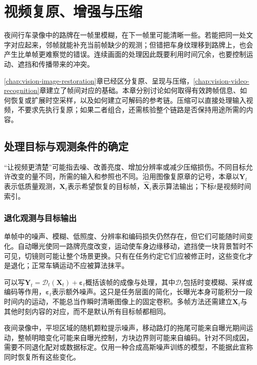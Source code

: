 \chapter{视频复原、增强与压缩}
\label{chap:vision-video-restoration}

夜间行车录像中的路牌在一帧里模糊，在下一帧里可能清晰一些。若能把同一处文字对应起来，邻帧就能补充当前帧缺少的观测；但错把车身纹理移到路牌上，也会产生比单帧更难察觉的错误。连续画面的处理因此既要利用时间冗余，也要控制运动、遮挡和传播带来的冲突。

\ref{chap:vision-image-restoration}章已经区分复原、呈现与压缩，\ref{chap:vision-video-recognition}章建立了帧间对应的基础。本章分别讨论如何取得有效跨帧信息、如何恢复或扩展时空采样，以及如何建立可解码的参考链。压缩可以直接处理输入视频，不要求先执行复原；如果二者组合，还需核验整个链路是否保持用途所需的内容。

\section{处理目标与观测条件的确定}
\label{sec:vision-video-restoration-goals}

“让视频更清楚”可能指去噪、改善亮度、增加分辨率或减少压缩损伤。不同目标允许改变的量不同，所需的输入和参照也不同。沿用图像复原章的记号，本章以$\bm{Y}_t$表示低质量观测，$\bm{X}_t$表示希望恢复的目标帧，$\widehat{\bm{X}}_t$表示算法输出；下标$t$是视频时间索引。

\subsection{退化观测与目标输出}
\label{sec:vision-video-degradation}

单帧中的噪声、模糊、低照度、分辨率和编码损失仍然存在，但它们可能随时间变化。自动曝光使同一路牌亮度改变，运动使车身边缘移动，遮挡使一块背景暂时不可见，切镜则可能让整个场景更换。只有在任务约定它们应被修正时，这些变化才是退化；正常车辆运动不应被算法抹平。

可以写$\bm{Y}_t=\mathcal{D}_t(\bm{X}_t)+\bm{\varepsilon}_t$概括该帧的成像与处理，其中$\mathcal{D}_t$包括时变模糊、采样或编码等作用，$\bm{\varepsilon}_t$表示额外噪声。这只是任务层面的简化，长曝光本身可能积分一段时间内的运动，不能总当作瞬时清晰图像上的固定卷积。多帧方法还需建立$\bm{X}_t$与其他时刻内容的对应，而不是默认所有目标帧都相同。

夜间录像中，平坦区域的随机颗粒提示噪声，移动路灯的拖尾可能来自曝光期间运动，整帧明暗变化可能来自曝光控制，方块边界则可能来自编码。针对不同成因，需要不同退化配对或数据标定。仅用一种合成高斯噪声训练的模型，不能据此宣称同时恢复所有这些变化。

